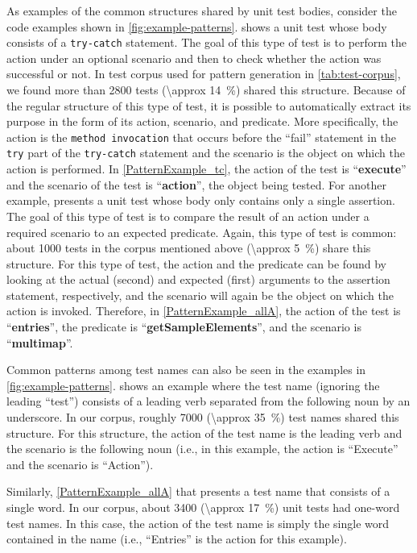 \documentclass[proposal.tex]{subfiles}
\begin{document}
As examples of the common structures shared by unit test bodies, consider the code examples shown in \cref{fig:example-patterns}.
%
 shows a unit test whose body consists of a \texttt{try-catch} statement.
%
The goal of this type of test is to perform the action under an optional scenario and then to check whether the action was successful or not.
%
In test corpus used for pattern generation in \cref{tab:test-corpus}, we found more than \num{2800} tests (\SI{\approx 14}{\percent}) shared this structure.
%
Because of the regular structure of this type of test, it is possible to automatically extract its purpose in the form of its action, scenario, and predicate.
%
More specifically, the action is the \texttt{method invocation} that occurs before the \enquote{fail} statement in the \texttt{try} part of the \texttt{try-catch} statement and the scenario is the object on which the action is performed.
%
In \cref{PatternExample_tc}, the action of the test is \enquote{\textbf{execute}} and the scenario of the test is \enquote{\textbf{action}}, the object being tested.
%
For another example,  presents a unit test whose body only contains only a single assertion.
%
The goal of this type of test is to compare the result of an action under a required scenario to an expected predicate.
% 
Again, this type of test is common: about \num{1000} tests in the corpus mentioned above (\SI{\approx 5}{\percent}) share this structure.
%
For this type of test, the action and the predicate can be found by looking at the actual (second) and expected (first) arguments to the assertion statement, respectively, and the scenario will again be the object on which the action is invoked.
%
Therefore, in \cref{PatternExample_allA}, the action of the test is \enquote{\textbf{entries}}, the predicate is \enquote{\textbf{getSampleElements}}, and the scenario is \enquote{\textbf{multimap}}.

Common patterns among test names can also be seen in the examples in \cref{fig:example-patterns}.
%
 shows an example where the test name (ignoring the leading \enquote{test}) consists of a leading verb separated from the following noun by an underscore.
%
In our corpus, roughly \num{7000} (\SI{\approx 35}{\percent}) test names shared this structure.
%
For this structure, the action of the test name is the leading verb and the scenario is the following noun (i.e., in this example, the action is \enquote{Execute} and the scenario is \enquote{Action}).

Similarly, \cref{PatternExample_allA} that presents a test name that consists of a single word.
%
In our corpus, about \num{3400} (\SI{\approx 17}{\percent}) unit tests had one-word test names.
%
In this case, the action of the test name is simply the single word contained in the name (i.e., \enquote{Entries} is the action for this example).
\end{document}
